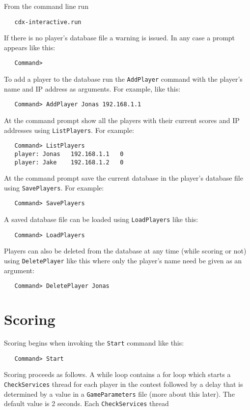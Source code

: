 \documentclass[12pt]{article}
\begin{document}
From the command line run
\begin{verbatim}
   cdx-interactive.run
\end{verbatim}
If there is no player's database file a warning is issued.  In any case a prompt
appears like this:
\begin{verbatim}
   Command>
\end{verbatim}
To add a player to the database run the {\tt AddPlayer} command with the
player's name and IP address as arguments. For example, like this:
\begin{verbatim}
   Command> AddPlayer Jonas 192.168.1.1
\end{verbatim}
At the command prompt show all the players with their current scores and IP
addresses using {\tt ListPlayers}.  For example:
\begin{verbatim}
   Command> ListPlayers 
   player: Jonas   192.168.1.1   0
   player: Jake    192.168.1.2   0
\end{verbatim}
At the command prompt save the current database in the player's database file
using {\tt SavePlayers}.  For example:
\begin{verbatim}
   Command> SavePlayers
\end{verbatim}
A saved database file can be loaded using {\tt LoadPlayers} like this:
\begin{verbatim}
   Command> LoadPlayers
\end{verbatim}
Players can also be deleted from the database at any time (while scoring or not)
using {\tt DeletePlayer} like this where only the player's name need be given as
an argument:
\begin{verbatim}
   Command> DeletePlayer Jonas
\end{verbatim}

\section{Scoring}

Scoring begins when invoking the {\tt Start} command like this:
\begin{verbatim}
   Command> Start
\end{verbatim}
Scoring proceeds as follows.  A while loop contains a for loop which starts a
{\tt CheckServices} thread for each player in the contest followed by a delay
that is determined by a value in a {\tt GameParameters} file (more about this
later).  The default value is 2 seconds.  Each {\tt CheckServices} thread 
\end{document}
